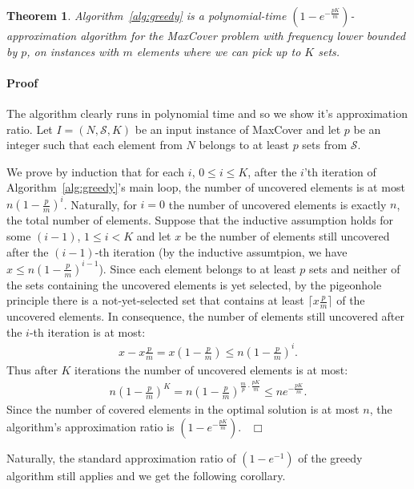 \documentclass[11pt]{article}
\newtheorem{theorem}{Theorem}
\newenvironment{proof}{\paragraph{Proof}}{\hfill$\Box$\medskip}
\newcommand{\calS}{{{\mathcal{S}}}}
\begin{document}
\begin{theorem}\label{theorem:greedy}
  Algorithm~\ref{alg:greedy} is a polynomial-time $(1 -
  e^{-\frac{pK}{m}})$-approximation algorithm 
  for the MaxCover problem with frequency lower bounded by $p$,
  on instances with $m$ elements where we can pick up to $K$ sets.
\end{theorem}
\begin{proof}
  The algorithm clearly runs in polynomial time and so we show it's
  approximation ratio. Let $I = (N,\calS,K)$ be an input instance of
  MaxCover and let $p$ be an integer such that each element from $N$
  belongs to at least $p$ sets from $\calS$.
  
  We prove by induction that for each $i$, $0 \leq i \leq K$, after
  the $i$'th iteration of Algorithm~\ref{alg:greedy}'s main loop, the
  number of uncovered elements is at most $n(1 -
  \frac{p}{m})^{i}$. Naturally, for $i=0$ the number of uncovered
  elements is exactly $n$, the total number of elements.  Suppose that
  the inductive assumption holds for some $(i-1)$, $1 \leq i < K$ and
  let $x$ be the number of elements still uncovered after the
  $(i-1)$-th iteration (by the inductive assumtpion, we have $x \leq
  n(1 - \frac{p}{m})^{i-1}$). Since each element belongs to at least
  $p$ sets and neither of the sets containing the uncovered elements
  is yet selected, by the pigeonhole principle there is a
  not-yet-selected set that contains at least $\lceil x\frac{p}{m}
  \rceil$ of the uncovered elements.  In consequence, the number of
  elements still uncovered after the $i$-th iteration is at most:
  \begin{align*}
    x - x\frac{p}{m} = x\left(1 - \frac{p}{m}\right) \leq n\left(1 - \frac{p}{m}\right)^{i}
    \textrm{.}
  \end{align*}
  Thus after $K$ iterations the number of uncovered elements is at
  most:
  \begin{align*}
    n\left(1 - \frac{p}{m}\right)^{K} = n\left(1 - \frac{p}{m}\right)^{\frac{m}{p}\cdot
      \frac{pK}{m}} \leq ne^{-\frac{pK}{m}}\textrm{.}
  \end{align*}
  Since the number of covered elements in the optimal solution is at
  most $n$, the algorithm's approximation ratio is $(1 -
  e^{-\frac{pK}{m}})$.~
\end{proof}

Naturally, the standard approximation ratio of $(1 - e^{-1})$ of the
greedy algorithm still applies and we get the following corollary.
\end{document}
